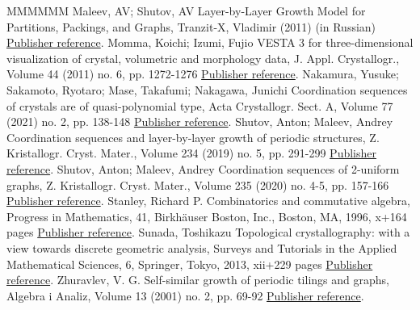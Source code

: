 \documentclass[11pt]{article}
\theoremstyle{definition}
\numberwithin{equation}{section}
\begin{document}
\begin{thebibliography}{MMMMMM}
 Maleev, AV; Shutov, AV Layer-by-Layer Growth Model for Partitions, Packings, and Graphs, Tranzit-X, Vladimir (2011) (in Russian) \href{https://alco.centre-mersenne.org/articles/10.5802/alco.445/#MS11}{Publisher reference}.
 Momma, Koichi; Izumi, Fujio VESTA 3 for three-dimensional visualization of crystal, volumetric and morphology data, J. Appl. Crystallogr., Volume 44 (2011) no. 6, pp. 1272-1276 \href{https://alco.centre-mersenne.org/articles/10.5802/alco.445/#MI11}{Publisher reference}.
 Nakamura, Yusuke; Sakamoto, Ryotaro; Mase, Takafumi; Nakagawa, Junichi Coordination sequences of crystals are of quasi-polynomial type, Acta Crystallogr. Sect. A, Volume 77 (2021) no. 2, pp. 138-148 \href{https://alco.centre-mersenne.org/articles/10.5802/alco.445/#NSMN21}{Publisher reference}.
 Shutov, Anton; Maleev, Andrey Coordination sequences and layer-by-layer growth of periodic structures, Z. Kristallogr. Cryst. Mater., Volume 234 (2019) no. 5, pp. 291-299 \href{https://alco.centre-mersenne.org/articles/10.5802/alco.445/#SM19}{Publisher reference}.
 Shutov, Anton; Maleev, Andrey Coordination sequences of 2-uniform graphs, Z. Kristallogr. Cryst. Mater., Volume 235 (2020) no. 4-5, pp. 157-166 \href{https://alco.centre-mersenne.org/articles/10.5802/alco.445/#SM20a}{Publisher reference}.
 Stanley, Richard P. Combinatorics and commutative algebra, Progress in Mathematics, 41, Birkhäuser Boston, Inc., Boston, MA, 1996, x+164 pages \href{https://alco.centre-mersenne.org/articles/10.5802/alco.445/#Sta96}{Publisher reference}.
 Sunada, Toshikazu Topological crystallography: with a view towards discrete geometric analysis, Surveys and Tutorials in the Applied Mathematical Sciences, 6, Springer, Tokyo, 2013, xii+229 pages \href{https://alco.centre-mersenne.org/articles/10.5802/alco.445/#Sunada}{Publisher reference}.
 Zhuravlev, V. G. Self-similar growth of periodic tilings and graphs, Algebra i Analiz, Volume 13 (2001) no. 2, pp. 69-92 \href{https://alco.centre-mersenne.org/articles/10.5802/alco.445/#Zhu02}{Publisher reference}.
\end{thebibliography}
\end{document}
